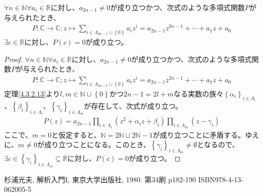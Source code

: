 \documentclass[dvipdfmx]{jsarticle}
\begin{document}
\begin{thm}\label{4.3.2.14}
$\forall n \in \mathbb{N}\forall a_{i} \in \mathbb{R}$に対し、$a_{2n - 1} \neq 0$が成り立つかつ、次式のような多項式関数$P$が与えられたとき、
\begin{align*}
P:\mathbb{C} \rightarrow \mathbb{C};z \mapsto \sum_{i \in \varLambda_{2n - 1} \cup \left\{ 0 \right\}} {a_{i}z^{i}} = a_{2n - 1}z^{2n - 1} + \cdots + a_{1}z + a_{0}
\end{align*}
$\exists c \in \mathbb{R}$に対し、$P(c) = 0$が成り立つ。
\end{thm}
\begin{proof}
$\forall n \in \mathbb{N}\forall a_{i} \in \mathbb{R}$に対し、$a_{2n - 1} \neq 0$が成り立つかつ、次式のような多項式関数$P$が与えられたとき、
\begin{align*}
P:\mathbb{C} \rightarrow \mathbb{C};z \mapsto \sum_{i \in \varLambda_{2n - 1} \cup \left\{ 0 \right\}} {a_{i}z^{i}} = a_{2n - 1}z^{2n - 1} + \cdots + a_{1}z + a_{0}
\end{align*}
定理\ref{4.3.2.13}より$l,m \in \mathbb{N} \cup \left\{ 0 \right\}$かつ$2n - 1 = 2l + m$なる実数の族々$\left\{ \alpha_{i} \right\}_{i \in \varLambda_{l}}$、$\left\{ \beta_{i} \right\}_{i \in \varLambda_{l}}$、$\left\{ \gamma_{i} \right\}_{i \in \varLambda_{m}}$が存在して、次式が成り立つ。
\begin{align*}
P(z) = a_{2n - 1}\prod_{i \in \varLambda_{l}} \left( z^{2} + \alpha_{i}z + \beta_{i} \right)\prod_{i \in \varLambda_{m}} \left( z - \gamma_{i} \right)
\end{align*}
ここで、$m = 0$と仮定すると、$\mathbb{N} = 2\mathbb{N} \sqcup 2\mathbb{N} - 1$が成り立つことに矛盾する。ゆえに、$m \neq 0$が成り立つことになる。このとき、$\left\{ \gamma_{i} \right\}_{i \in \varLambda_{m}} \neq \emptyset$となるので、$\exists c \in \left\{ \gamma_{i} \right\}_{i \in \varLambda_{m}} \subseteq \mathbb{R}$に対し、$P(c) = 0$が成り立つ。
\end{proof}
\begin{thebibliography}{50}
  杉浦光夫, 解析入門I, 東京大学出版社, 1980. 第34刷 p182-190 ISBN978-4-13-062005-5
\end{thebibliography}
\end{document}
